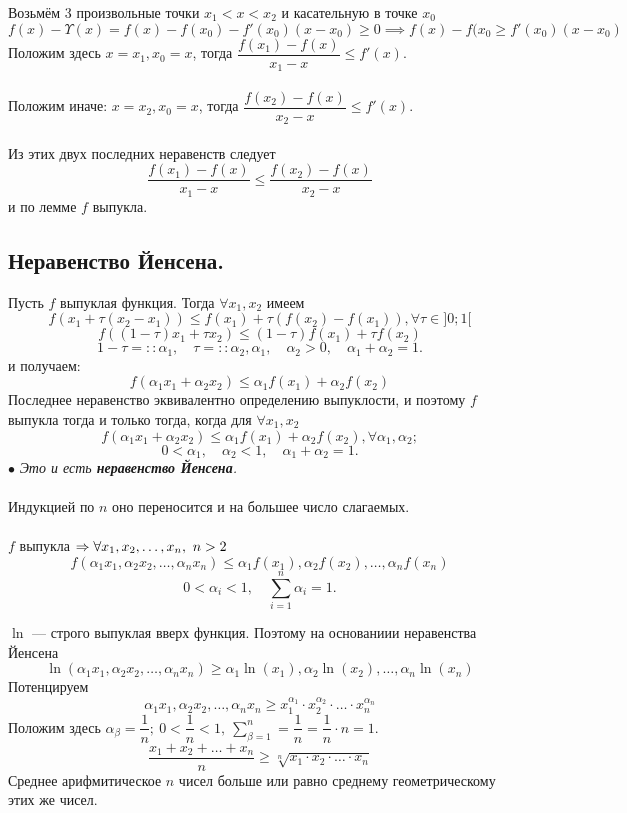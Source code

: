 \begin{Proof}
	Возьмём 3 произвольные точки $x_{1} < x < x_{2}$ и касательную в точке $x_{0}$
	$$f(x) - \Upsilon(x) = f(x) - f(x_{0}) - f'(x_{0})(x - x_{0}) \geq 0 \implies f(x) - f(x_{0} \geq f'(x_{0})(x - x_{0})$$
	Положим здесь $x = x_{1}, x_{0} = x$, тогда $\dfrac{f(x_{1}) - f(x)}{x_{1} - x} \leq f'(x)$.\\\\
	Положим иначе: $x = x_{2}, x_{0} = x$, тогда $\dfrac{f(x_{2}) - f(x)}{x_{2} - x} \leq f'(x)$.\\\\
	Из этих двух последних неравенств следует 
	$$\frac{f(x_{1}) - f(x)}{x_{1} - x} \leq \frac{f(x_{2}) - f(x)}{x_{2} - x}$$
	и по лемме $f$ выпукла.
\end{Proof}
\subsection{Неравенство Йенсена.}
Пусть $f$ выпуклая функция. Тогда $\forall x_{1}, x_{2}$ имеем 
$$f(x_{1} + \tau(x_{2} - x_{1})) \leq f(x_{1}) + \tau(f(x_{2}) - f(x_{1})), \forall \tau \in ]0;1[ $$
$$f((1 - \tau)x_{1} + \tau x_{2}) \leq (1 - \tau)f(x_{1}) + \tau f(x_{2})$$
$$1 - \tau = :: \alpha_{1},\quad \tau = :: \alpha_{2}, \alpha_{1},\quad \alpha_{2} > 0,\quad \alpha_{1} + \alpha_{2} = 1.$$
и получаем: \\
$$f(\alpha_{1}x_{1} +\alpha_{2}x_{2}) \leq \alpha_{1}f(x_{1}) + \alpha_{2}f(x_{2})$$
Последнее неравенство эквивалентно определению выпуклости, и поэтому $f$ выпукла тогда и только тогда, когда для $\forall x_{1}, x_{2}$
$$f(\alpha_{1}x_{1} +\alpha_{2}x_{2}) \leq \alpha_{1}f(x_{1}) + \alpha_{2}f(x_{2}), \forall \alpha_{1}, \alpha_{2};$$
$$0 < \alpha_{1},\quad \alpha_{2} < 1,\quad \alpha_{1} + \alpha_{2} = 1.$$
$\bullet$ \textit{Это и есть \textbf{неравенство Йенсена}.} \\\\
Индукцией по $n$ оно переносится и на большее число слагаемых. \\\\
$f$ выпукла $\Rightarrow \forall x_{1}, x_{2}, \ldots, x_{n},\ n > 2$ 
$$f(\alpha_{1}x_{1}, \alpha_{2}x_{2},\ldots, \alpha_{n}x_{n}) \leq \alpha_{1}f(x_{1}), \alpha_{2}f(x_{2}),\ldots, \alpha_{n}f(x_{n})$$
$$0 < \alpha_{i} < 1,\quad \sum_{i=1}^{n}\alpha_{i} = 1.$$
\begin{example}
	$\ln$ --- строго выпуклая вверх функция. Поэтому на основаниии неравенства Йенсена \\
	$$\ln(\alpha_{1}x_{1}, \alpha_{2}x_{2},\ldots, \alpha_{n}x_{n}) \geq \alpha_{1}\ln(x_{1}), \alpha_{2}\ln(x_{2}),\ldots, \alpha_{n}\ln(x_{n})$$
	Потенцируем
	$$\alpha_{1}x_{1}, \alpha_{2}x_{2} ,\ldots, \alpha_{n}x_{n} \geq x_{1}^{\alpha_{1}} \cdot x_{2}^{\alpha_{2}} \cdot \ldots \cdot x_{n}^{\alpha_{n}}$$
	Положим здесь $\alpha_{\beta} = \dfrac{1}{n};\ 0 < \dfrac{1}{n} < 1,\ \sum\limits_{\beta=1}^{n} = \dfrac{1}{n}= \dfrac{1}{n} \cdot n = 1$.
	$$\frac{x_{1} + x_{2} + \ldots + x_{n}}{n} \geq \sqrt[n]{x_{1}\cdot x_{2}\cdot\ldots\cdot x_{n}}$$
	Среднее арифмитическое $n$ чисел больше или равно среднему геометрическому этих же чисел.
\end{example}
